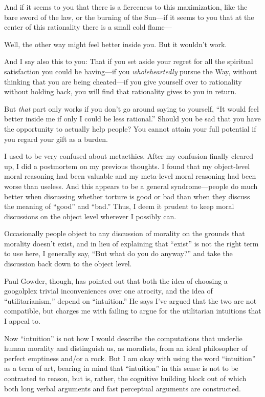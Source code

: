 {
 And if it seems to you that there is a fierceness to this
maximization, like the bare sword of the law, or the burning of the
Sun---if it seems to you that at the center of this rationality there
is a small cold flame---}

{
 Well, the other way might feel better inside you. But it
wouldn't work.}

{
 And I say also this to you: That if you set aside your regret for
all the spiritual satisfaction you could be having---if you
\textit{wholeheartedly} pursue the Way, without thinking that you are
being cheated---if you give yourself over to rationality without
holding back, you will find that rationality gives to you in return.}

{
 But \textit{that} part only works if you don't go
around saying to yourself, ``It would feel better
inside me if only I could be less rational.'' Should
you be sad that you have the opportunity to actually help people? You
cannot attain your full potential if you regard your gift as a burden.}

\myendsectiontext


{
 I used to be very confused about metaethics. After my confusion
finally cleared up, I did a postmortem on my previous thoughts. I found
that my object-level moral reasoning had been valuable and my
meta-level moral reasoning had been worse than useless. And this
appears to be a general syndrome---people do much better when
discussing whether torture is good or bad than when they discuss the
meaning of ``good'' and
``bad.'' Thus, I deem it prudent to
keep moral discussions on the object level wherever I possibly can.}

{
 Occasionally people object to any discussion of morality on the
grounds that morality doesn't exist, and in lieu of
explaining that ``exist'' is not the
right term to use here, I generally say, ``But what do
you do anyway?'' and take the discussion back down to
the object level.}

{
 Paul Gowder, though, has pointed out that both the idea of
choosing a googolplex trivial inconveniences over one atrocity, and the
idea of ``utilitarianism,'' depend
on ``intuition.'' He says
I've argued that the two are not compatible, but
charges me with failing to argue for the utilitarian intuitions that I
appeal to.}

{
 Now ``intuition'' is not how I
would describe the computations that underlie human morality and
distinguish us, as moralists, from an ideal philosopher of perfect
emptiness and/or a rock. But I am okay with using the word
``intuition'' as a term of art,
bearing in mind that ``intuition''
in this sense is not to be contrasted to reason, but is, rather, the
cognitive building block out of which both long verbal arguments and
fast perceptual arguments are constructed.}

